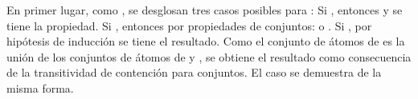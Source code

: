 \begin{isabellebody}
\begin{isamarkuptext}
\begin{demostracion}
  En primer lugar, como 
  , se desglosan tres
  casos posibles para :
  Si , entonces  y se tiene la propiedad.
  Si , entonces por propiedades de 
  conjuntos:
   o . Si , por hipótesis 
  de inducción se tiene el resultado. Como el conjunto de átomos de
   es la unión de los conjuntos de átomos de  y , se 
  obtiene el resultado como consecuencia de la transitividad de 
  contención para conjuntos. El caso  se demuestra de la 
  misma forma.      
  \end{demostracion}


\end{isamarkuptext}
\end{isabellebody}
